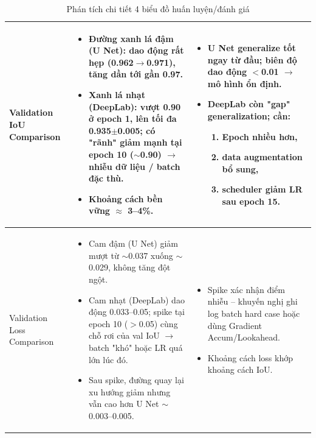 \documentclass[12pt]{report}
\begin{document}
\begin{table}[h!]
\begin{tabularx}{\textwidth}{|L{2.2cm}|L{5.8cm}|L{6.5cm}|}
Validation IoU Comparison &
\begin{itemize}[leftmargin=*,itemsep=1pt,parsep=0pt]
    \item Đường xanh lá đậm (U Net): dao động rất hẹp (0.962$\to$0.971), tăng dần tới gần 0.97.
    \item Xanh lá nhạt (DeepLab): vượt 0.90 ở epoch 1, lên tối đa 0.935$\pm$0.005; có "rãnh" giảm mạnh tại epoch 10 ($\sim$0.90) $\to$ nhiễu dữ liệu / batch đặc thù.
    \item Khoảng cách bền vững $\approx$ 3–4\%.
\end{itemize}
&
\begin{itemize}[leftmargin=*,itemsep=1pt,parsep=0pt]
    \item U Net generalize tốt ngay từ đầu; biên độ dao động $<$0.01 $\rightarrow$ mô hình ổn định.
    \item DeepLab còn "gap" generalization; cần:
    \begin{enumerate}[leftmargin=*,itemsep=1pt,parsep=0pt]
        \item Epoch nhiều hơn,
        \item data augmentation bổ sung,
        \item scheduler giảm LR sau epoch 15.
    \end{enumerate}
\end{itemize} \\
\hline

Validation Loss Comparison &
\begin{itemize}[leftmargin=*,itemsep=1pt,parsep=0pt]
    \item Cam đậm (U Net) giảm mượt từ $\sim$0.037 xuống $\sim$0.029, không tăng đột ngột.
    \item Cam nhạt (DeepLab) dao động 0.033–0.05; spike tại epoch 10 ($>$0.05) cùng chỗ rơi của val IoU $\to$ batch "khó" hoặc LR quá lớn lúc đó.
    \item Sau spike, đường quay lại xu hướng giảm nhưng vẫn cao hơn U Net $\sim$0.003–0.005.
\end{itemize}
&
\begin{itemize}[leftmargin=*,itemsep=1pt,parsep=0pt]
    \item Spike xác nhận điểm nhiễu – khuyến nghị ghi log batch hard case hoặc dùng Gradient Accum/Lookahead.
    \item Khoảng cách loss khớp khoảng cách IoU.
\end{itemize} \\
\hline

\end{tabularx}
\caption{Phán tích chi tiết 4 biểu đồ huấn luyện/đánh giá}
\end{table}
\end{document}

